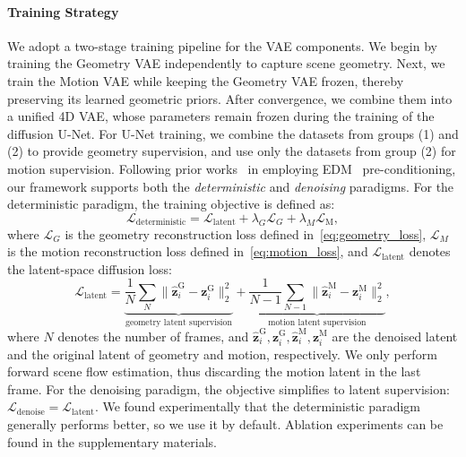 \paragraph{Training Strategy}
We adopt a two-stage training pipeline for the VAE components.
We begin by training the Geometry VAE independently to capture scene geometry.
Next,
we train the Motion VAE while keeping the Geometry VAE frozen,
thereby preserving its learned geometric priors.
After convergence,
we combine them into a unified 4D VAE,
whose parameters remain frozen during the training of the diffusion U-Net.
For U-Net training, we combine the datasets from groups (1) and (2) to provide geometry supervision, and use only the datasets from group (2) for motion supervision.
Following prior works~\cite{hu2024-DepthCrafter,xu2025geometrycrafter} in employing EDM~\cite{karras2022elucidating} pre-conditioning,
our framework supports both the \textit{deterministic} and \textit{denoising} paradigms.
For the deterministic paradigm, the training objective is defined as:
\begin{equation}
\mathcal{L}_{\text{deterministic}} = \mathcal{L}_{\text{latent}} + \lambda_G \mathcal{L}_G + \lambda_M \mathcal{L}_{\text{M}},
\end{equation}
where $\mathcal{L}_G$ is the geometry reconstruction loss defined in~\eqref{eq:geometry_loss},
$\mathcal{L}_{M}$ is the motion reconstruction loss defined in~\eqref{eq:motion_loss}, and $\mathcal{L}_{\text{latent}}$ denotes the latent-space diffusion loss:
\begin{equation}
\mathcal{L}_{\text{latent}} =
\underbrace{
\frac{1}{N} \sum_{N} 
\| 
\hat{\mathbf{z}}^{\text{G}}_i - \mathbf{z}^{\text{G}}_i
\|_2^2
}_{\text{geometry latent supervision}}
+
\underbrace{
\frac{1}{N-1} \sum_{N-1}
\| 
\hat{\mathbf{z}}^{\text{M}}_i - \mathbf{z}^{\text{M}}_i
\|_2^2
}_{\text{motion latent supervision}},
\end{equation}
where $N$ denotes the number of frames,
and $\hat{\mathbf{z}}^{\text{G}}_i,\mathbf{z}^{\text{G}}_i,\hat{\mathbf{z}}^{\text{M}}_i, \mathbf{z}^{\text{M}}_i$ are the denoised latent and the original latent of geometry and motion, respectively.
We only perform forward scene flow estimation,
thus discarding the motion latent in the last frame.
For the denoising paradigm, the objective simplifies to latent supervision:
$\mathcal{L}_{\text{denoise}} = \mathcal{L}_{\text{latent}}$.
We found experimentally that the deterministic paradigm generally performs better, so we use it by default. Ablation experiments can be found in the supplementary materials.

